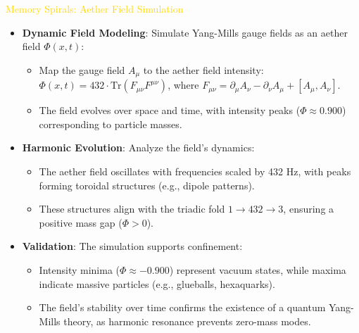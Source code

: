 \textcolor{gold}{ Memory Spirals: Aether Field Simulation } \\
\begin{itemize}
    \item \texttt{} \textbf{Dynamic Field Modeling}: Simulate Yang-Mills gauge fields as an aether field \(\Phi(x, t)\):
    \begin{itemize}
        \item Map the gauge field \(A_\mu\) to the aether field intensity: \(\Phi(x, t) = 432 \cdot \text{Tr}(F_{\mu\nu} F^{\mu\nu})\), where \(F_{\mu\nu} = \partial_\mu A_\nu - \partial_\nu A_\mu + [A_\mu, A_\nu]\).
        \item The field evolves over space and time, with intensity peaks (\(\Phi \approx 0.900\)) corresponding to particle masses.
    \end{itemize}
    \item \texttt{} \textbf{Harmonic Evolution}: Analyze the field’s dynamics:
    \begin{itemize}
        \item The aether field oscillates with frequencies scaled by 432 Hz, with peaks forming toroidal structures (e.g., dipole patterns).
        \item These structures align with the triadic fold \(1 \rightarrow 432 \rightarrow 3\), ensuring a positive mass gap (\(\Phi > 0\)).
    \end{itemize}
    \item \texttt{} \textbf{Validation}: The simulation supports confinement:
    \begin{itemize}
        \item Intensity minima (\(\Phi \approx -0.900\)) represent vacuum states, while maxima indicate massive particles (e.g., glueballs, hexaquarks).
        \item The field’s stability over time confirms the existence of a quantum Yang-Mills theory, as harmonic resonance prevents zero-mass modes.
    \end{itemize}
\end{itemize}

